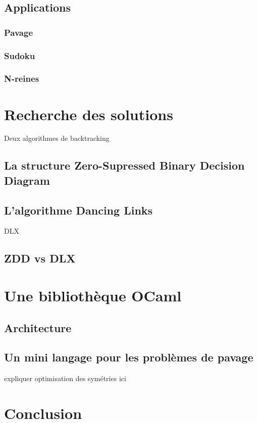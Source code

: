 \documentclass[a4paper]{article}
\begin{document}
\subsection{Applications}

\subsubsection{Pavage}
\subsubsection{Sudoku}
\subsubsection{N-reines}

\section{Recherche des solutions}

Deux algorithmes de backtracking

\subsection{La structure Zero-Supressed Binary Decision Diagram}

\subsection{L'algorithme Dancing Links}

DLX~\cite{dlx}

\subsection{ZDD vs DLX}


\section{Une bibliothèque OCaml}

\subsection{Architecture}

\subsection{Un mini langage pour les problèmes de pavage}

 expliquer optimisation des symétries ici

\section{Conclusion}




\end{document}
